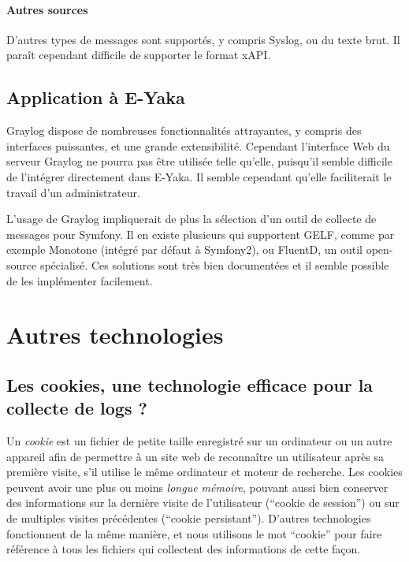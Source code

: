                 \paragraph{Autres sources}
                    D'autres types de messages sont supportés, y compris Syslog, ou du texte brut. Il paraît cependant difficile de supporter le format xAPI.

        \subsection{Application à E-Yaka}

            Graylog dispose de nombreuses fonctionnalités attrayantes, y compris des interfaces puissantes, et une grande extensibilité. Cependant l'interface Web du serveur Graylog ne pourra pas être utilisée telle qu'elle, puisqu'il semble difficile de l'intégrer directement dans E-Yaka. Il semble cependant qu'elle faciliterait le travail d'un administrateur.

            L'usage de Graylog impliquerait de plus la sélection d'un outil de collecte de messages pour Symfony. Il en existe plusieurs qui supportent GELF, comme par exemple Monotone (intégré par défaut à Symfony2), ou FluentD, un outil open-source spécialisé. Ces solutions sont très bien documentées et il semble possible de les implémenter facilement.

    
    \section{Autres technologies}
    
        \subsection{Les cookies, une technologie efficace pour la collecte de logs ?}
        
            Un \emph{cookie} est un fichier de petite taille enregistré sur un ordinateur ou un autre appareil afin de permettre à un site web de reconnaître un utilisateur après sa première visite, s'il utilise le même ordinateur et moteur de recherche. Les cookies peuvent avoir une plus ou moins \emph{longue mémoire}, pouvant aussi bien conserver des informations sur la dernière visite de l'utilisateur (\enquote{cookie de session}) ou sur de multiples visites précédentes (\enquote{cookie persistant}). D'autres technologies fonctionnent de la même manière, et nous utilisons le mot \enquote{cookie} pour faire référence à tous les fichiers qui collectent des informations de cette façon.
            
